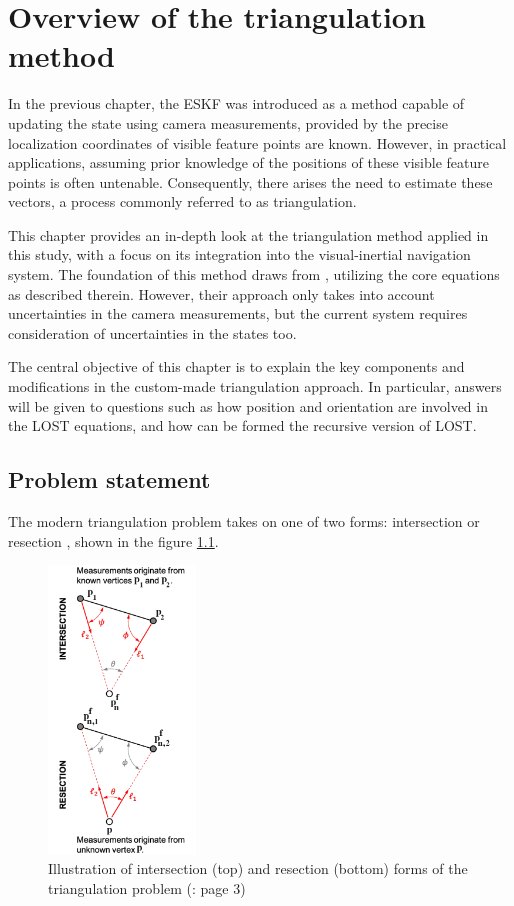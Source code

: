 \chapter{Overview of the triangulation method}
\label{chap:LOST}

In the previous chapter, the ESKF was introduced as a method capable of updating the state using camera measurements, provided by the precise localization coordinates of visible feature points are known. However, in practical applications, assuming prior knowledge of the positions of these visible feature points is often untenable. Consequently, there arises the need to estimate these vectors, a process commonly referred to as triangulation.

This chapter provides an in-depth look at the triangulation method applied in this study, with a focus on its integration into the visual-inertial navigation system. The foundation of this method draws from \cite{absolute-triangulation}, utilizing the core equations as described therein. However, their approach only takes into account uncertainties in the camera measurements, but the current system requires consideration of uncertainties in the states too.

The central objective of this chapter is to explain the key components and modifications in the custom-made triangulation approach. In particular, answers will be given to questions such as how position and orientation are involved in the LOST equations, and how can be formed the recursive version of LOST.

\section{Problem statement}

The modern triangulation problem takes on one of two forms: intersection or resection \cite{ResectionInSurvey_1918}, shown in the figure \ref{fig:intersec-resec}.

\begin{figure}[!ht]
    \centering
    \includegraphics[width=0.35\textwidth]{figures/intersec-resec.png}
    \caption{Illustration of intersection (top) and resection (bottom) forms of the triangulation problem (\cite{absolute-triangulation}: page 3)}
    \label{fig:intersec-resec}
\end{figure}

